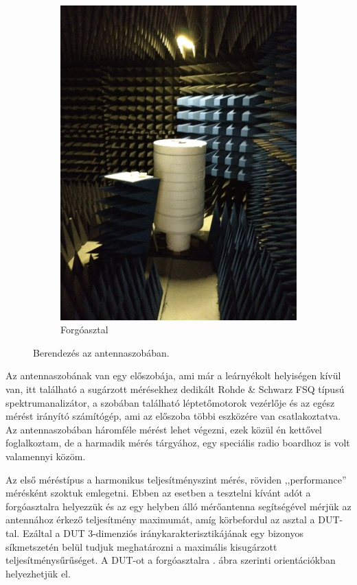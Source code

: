 \documentclass[a4paper,12pt,titlepage]{article}
\begin{document}
\begin{figure}
\begin{subfigure}{0.4\textwidth}
                    \includegraphics[width=\textwidth]{kep/szerkesztett/antennaszoba-asztal.jpg}
                    \caption{Forgóasztal}
                \end{subfigure}
                \caption{Berendezés az antennaszobában.}
                \label{fig:antennaszoba}
            \end{figure}
            \par
            Az antennaszobának van egy előszobája, ami már a leárnyékolt helyiségen kívül van, itt található a sugárzott mérésekhez dedikált Rohde \& Schwarz FSQ típusú spektrumanalizátor, a szobában található léptetőmotorok vezérlője és az egész mérést irányító számítógép, ami az előszoba többi eszközére van csatlakoztatva. Az antennaszobában háromféle mérést lehet végezni, ezek közül én kettővel foglalkoztam, de a harmadik mérés tárgyához, egy speciális radio boardhoz is volt valamennyi közöm.
            \par
            Az első méréstípus a harmonikus teljesítményszint mérés, röviden ,,performance'' mérésként szoktuk emlegetni. Ebben az esetben a tesztelni kívánt adót a forgóasztalra helyezzük és az egy helyben álló mérőantenna segítségével mérjük az antennához érkező teljesítmény maximumát, amíg körbefordul az asztal a DUT-tal. Ezáltal a DUT 3-dimenziós iránykarakterisztikájának egy bizonyos síkmetszetén belül tudjuk meghatározni a maximális kisugárzott teljesítménysűrűséget. A DUT-ot a forgóasztalra . ábra szerinti orientációkban helyezhetjük el.
\end{document}

